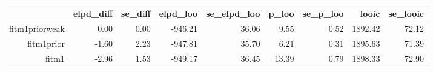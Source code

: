 \begin{table}[ht]
\centering
\begin{tabular}{rrrrrrrrr}
  \hline
 & elpd\_diff & se\_diff & elpd\_loo & se\_elpd\_loo & p\_loo & se\_p\_loo & looic & se\_looic \\ 
  \hline
fitm1priorweak & 0.00 & 0.00 & -946.21 & 36.06 & 9.55 & 0.52 & 1892.42 & 72.12 \\ 
  fitm1prior & -1.60 & 2.23 & -947.81 & 35.70 & 6.21 & 0.31 & 1895.63 & 71.39 \\ 
  fitm1 & -2.96 & 1.53 & -949.17 & 36.45 & 13.39 & 0.79 & 1898.33 & 72.90 \\ 
   \hline
\end{tabular}
\end{table}
